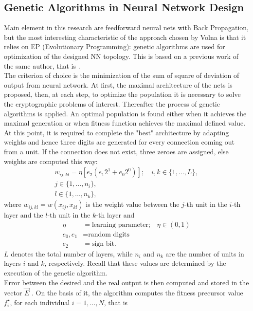 \documentclass[%
    corpo=11pt,
    twoside,
    stile=classica,
    oldstyle,
    autoretitolo,
    tipotesi=magistrale,
    greek,
    evenboxes,
    english
]{toptesi}
\begin{document}
\subsection{Genetic Algorithms in Neural Network Design}
Main element in this research are feedforward neural nets with Back Propagation, but the most interesting characteristic of the approach chosen by Volna is that it relies on EP (Evolutionary Programming): genetic algorithms are used for optimization of the designed NN topology. This is based on a previous work of the same author, that is \cite{volna2}. \\
The criterion of choice is the minimization of the sum of square of deviation of output from neural network. At first, the maximal architecture of the nets is proposed, then, at each step, to optimize the population it is necessary to solve the cryptographic problems of interest. Thereafter the process of genetic algorithms is applied. An optimal population is found either when it achieves the maximal generation or when fitness function achieves the maximal defined value. \\
At this point, it is required to complete the "best" architecture by adapting weights and hence three digits are generated for every
connection coming out from a unit. If the connection does not exist, three zeroes are assigned, else weights are computed this way:
\begin{align}
w_{ij,kl} = \eta[e_2(e_1 2^1 + e_0 2^0)]; \quad i,k\in\{1,\dots,L\}, \\
  j\in\{1,\dots, n_i\}, \nonumber \\
  l \in\{1, \dots, n_k\}, \nonumber 
\end{align}
where $w_{ij,kl} = w(x_{ij}, x_{kl})$ is the weight value between the $j$-th unit in the $i$-th layer and the $l$-th unit in the $k$-th layer and
\begin{align*}
    \eta &= \text{learning parameter;} \quad \eta \in (0,1)\\
    e_0, e_1 &= \text{random digits} \\
  	e_2 &= \text{sign bit}.
\end{align*}
$L$ denotes the total number of layers, while $n_i$ and $n_k$ are the number of units in layers $i$ and $k$, respectively. Recall that these values are determined by the execution of the genetic algorithm. \\
Error between the desired and the real output is then computed and stored in the vector $\vec{E}$ . On the basis of it, the algorithm computes the fitness precursor value $f_i^{\star}$, for each individual $i = 1, \dots, N$, that is
\end{document}
